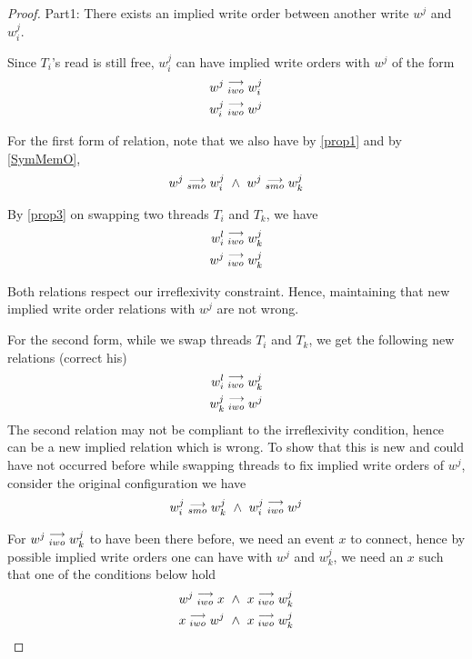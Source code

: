\begin{proof}
                Part1: There exists an implied write order between another write $w^j$ and $w_i^j$.

                Since $T_i$'s read is still free, $w_i^j$ can have implied write orders with $w^j$ of the form
                \begin{align}
                    w^j\stackrel{\longrightarrow}{_{iwo}}w_i^j \\
                    w_i^j\stackrel{\longrightarrow}{_{iwo}}w^j 
                \end{align}

                For the first form of relation, note that we also have by \ref{prop1} and by \ref{SymMemO}, 
                \begin{align}
                    \reln{w^j}{smo}{w_i^j} \ \wedge \ \reln{w^j}{smo}{w_k^j}
                \end{align}

                By \ref{prop3} on swapping two threads $T_i$ and $T_k$, we have 
                \begin{align}
                    w_i^l\stackrel{\longrightarrow}{_{iwo}}w_k^j \\
                    w^j\stackrel{\longrightarrow}{_{iwo}}w_k^j
                \end{align}

                Both relations respect our irreflexivity constraint.  Hence, maintaining that new implied write order relations with $w^j$ are not wrong.

                For the second form, while we swap threads $T_i$ and $T_k$, we get the following new relations (correct his)
                \begin{align}
                    w_i^l\stackrel{\longrightarrow}{_{iwo}}w_k^j \\
                    w_k^j\stackrel{\longrightarrow}{_{iwo}}w^j
                \end{align}
                The second relation may not be compliant to the irreflexivity condition, hence can be a new implied relation which is wrong. To show that this is new and could have not occurred before while swapping threads to fix implied write orders of $w^j$, consider the original configuration we have 
                \begin{align}
                    \reln{w_i^j}{smo}{w_k^j} \ \wedge \ \reln{w_i^j}{iwo}{w^j}
                \end{align}

                For $w^j\stackrel{\longrightarrow}{_{iwo}}w_k^j$ to have been there before, we need an event $x$ to connect, hence by possible implied write orders one can have with $w^j$ and $w_k^j$, we need an $x$ such that one of the conditions below hold
                \begin{align}
                    w^j\stackrel{\longrightarrow}{_{iwo}}x \ \wedge \ x\stackrel{\longrightarrow}{_{iwo}}w_k^j \\ 
                    x\stackrel{\longrightarrow}{_{iwo}}w^j \ \wedge \ x\stackrel{\longrightarrow}{_{iwo}}w_k^j
                \end{align}


\end{proof}
